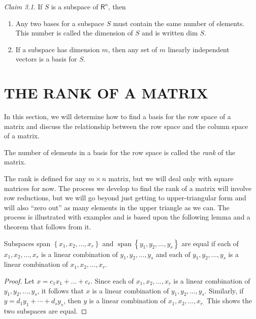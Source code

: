 \documentclass[../main.tex]{subfiles}
\begin{document}
\emph{Claim 3.1}. If $S$ is a subspace of  $\mathsf{R}^{n}$, then
\begin{enumerate}[label=\textbf{\arabic*}), noitemsep]
	\item Any two bases for a subspace $S$ must contain the same number of elements. This number is called the dimension of $S$ and is written dim $S$.
	\item If a subspace has dimension $m$, then any set of $m$ linearly independent vectors is a basis for $S$.
\end{enumerate}

\section[The Rank of a Matrix]{THE RANK OF A MATRIX}
In this section, we will determine how to find a basis for the row space of a matrix and discuss the relationship between the row space and the column space of a matrix.

\begin{definition}
	\label{defn:defn_3_6}
	 The number of elements in a basis for the row space is called the \emph{rank} of the matrix.
\end{definition}

The rank is defined for any $m \times n$ matrix, but we will deal only with square matrices for now. The process we develop to find the rank of a matrix will involve row reductions, but we will go beyond just getting to upper-triangular form and will also “zero out” as many elements in the upper triangle as we can. The process is illustrated with examples and is based upon the following lemma and a theorem that follows from it.



\begin{lemma}
	\label{lem:lem_3_1}
	Subspaces span $\left\{x_{1}, x_{2}, \ldots, x_{r}\right\}$ and $\operatorname{span}\left\{y_{1}, y_{2}, \ldots, y_{s}\right\}$ are equal if each of $x_{1}, x_{2}, \ldots, x_{r}$ is a linear combination of $y_{1}, y_{2}, \ldots, y_{s}$ and each of $y_{1}, y_{2}, \ldots, y_{s}$ is a linear combination of $x_{1}, x_{2}, \ldots, x_{r}$.
\end{lemma}

\begin{proof}
	Let $x=c_{1} x_{1}+\ldots+c_{r} .$ Since each of $x_{1}, x_{2}, \ldots, x_{r}$ is a linear combination of $y_{1}, y_{2}, \ldots, y_{s}$, it follows that $x$ is a linear combination of $y_{1}, y_{2}, \ldots, y_{s} .$ Similarly, if $y=d_{1} y_{1}+\cdots+d_{s} y_{s}$, then $y$ is a linear combination of $x_{1}, x_{2}, \ldots, x_{r .}$ This shows the two subspaces are equal.
\end{proof}
\end{document}
